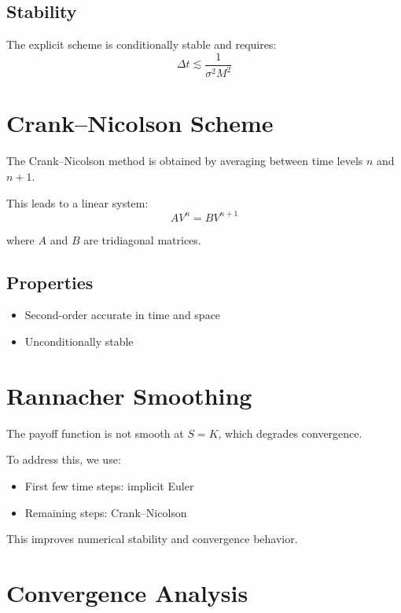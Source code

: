 \documentclass[11pt]{article}
\begin{document}
\subsection{Stability}

The explicit scheme is conditionally stable and requires:
\begin{equation}
\Delta t \lesssim \frac{1}{\sigma^2 M^2}
\end{equation}

\section{Crank--Nicolson Scheme}

The Crank--Nicolson method is obtained by averaging between time levels $n$ and $n+1$.

This leads to a linear system:
\begin{equation}
A V^n = B V^{n+1}
\end{equation}

where $A$ and $B$ are tridiagonal matrices.

\subsection{Properties}

\begin{itemize}
    \item Second-order accurate in time and space
    \item Unconditionally stable
\end{itemize}

\section{Rannacher Smoothing}

The payoff function is not smooth at $S = K$, which degrades convergence.

To address this, we use:
\begin{itemize}
    \item First few time steps: implicit Euler
    \item Remaining steps: Crank--Nicolson
\end{itemize}

This improves numerical stability and convergence behavior.

\section{Convergence Analysis}
\end{document}
